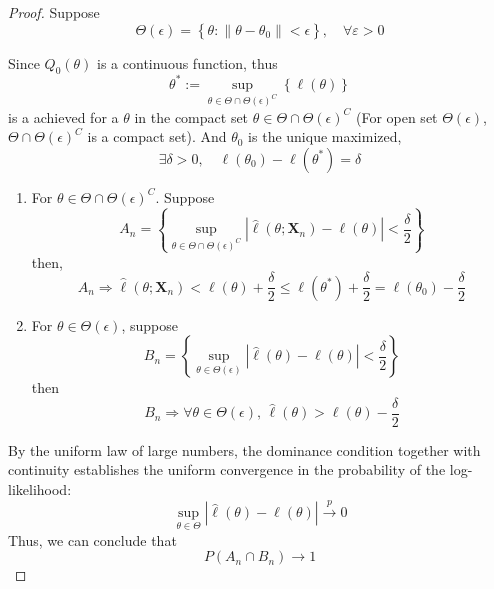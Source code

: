 \begin{proof}
	Suppose
	\begin{equation*}
		\Theta(\epsilon)=\left\{\theta:\left\|\theta-\theta_{0}\right\|<\epsilon\right\},\quad\forall\varepsilon>0
	\end{equation*}

	Since \(Q_{0}(\theta)\) is a continuous function, thus
	\begin{equation*}
		\theta^{*}:=\sup_{\theta\in\Theta\cap \Theta(\epsilon)^{C}}\left\{\ell(\theta)\right\}
	\end{equation*}
	is a achieved for a \(\theta\) in the compact set \(\theta\in\Theta\cap \Theta(\epsilon)^{C}\) (For open set \(\Theta(\epsilon)\), \(\Theta\cap\Theta(\epsilon)^{C}\) is a compact set). And \(\theta_{0}\) is the unique maximized,
	\begin{equation*}
		\exists\delta>0,\quad\ell\left(\theta_{0}\right)-\ell\left(\theta^{*}\right)=\delta
	\end{equation*}

	\begin{enumerate}
		\item For \(\theta\in\Theta\cap\Theta(\epsilon)^{C}\). Suppose
		      \begin{equation*}
			      A_{n}=\left\{\sup_{\theta\in\Theta\cap\Theta(\epsilon)^{C}}\left|\hat{\ell}\left(\theta;\textbf{X}_{n}\right)-\ell(\theta)\right|<\frac{\delta}{2}\right\}
		      \end{equation*}
		      then,
		      \begin{equation*}
			      A_{n}\Longrightarrow\hat{\ell}\left(\theta;\textbf{X}_{n}\right)<\ell(\theta)+\frac{\delta}{2}\leq \ell\left(\theta^{*}\right)+\frac{\delta}{2}=\ell\left(\theta_{0}\right)-\frac{\delta}{2}
		      \end{equation*}
		\item For \(\theta\in\Theta(\epsilon)\), suppose
		      \begin{equation*}
			      B_{n}=\left\{\sup_{\theta\in\Theta(\epsilon)}\left|\hat{\ell}\left(\theta\right)-\ell(\theta)\right|<\frac{\delta}{2}\right\}
		      \end{equation*}
		      then
		      \begin{equation*}
			      B_{n}\Longrightarrow\forall\theta\in\Theta(\epsilon),\,\hat{\ell}\left(\theta\right)>\ell(\theta)-\frac{\delta}{2}
		      \end{equation*}
	\end{enumerate}

	By the uniform law of large numbers, the dominance condition together with continuity establishes the uniform convergence in the probability of the log-likelihood:
	\begin{equation*}
		\sup_{\theta\in\Theta}|\hat{\ell}(\theta)-\ell(\theta)|\stackrel{p}{\rightarrow}0
	\end{equation*}
	Thus, we can conclude that
	\begin{equation*}
		P\left(A_{n}\cap B_{n}\right)\rightarrow 1
	\end{equation*}


\end{proof}
